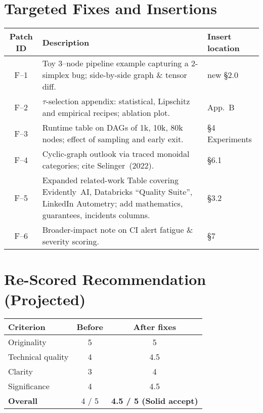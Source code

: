 \documentclass{article}
\begin{document}
\section{Targeted Fixes and Insertions}
\begin{tabular}{@{}c L{7.2cm} L{2.8cm}@{}}
\toprule
\textbf{Patch ID} & \textbf{Description} & \textbf{Insert location} \\
\midrule
F--1 & Toy 3--node pipeline example capturing a 2\hyp simplex bug; side\hyp by\hyp side graph \& tensor diff. & new \S2.0 \\
F--2 & \(\tau\)-selection appendix: statistical, Lipschitz and empirical recipes; ablation plot. & App.~B \\
F--3 & Runtime table on DAGs of 1k, 10k, 80k nodes; effect of sampling and early exit. & \S4 Experiments \\
F--4 & Cyclic\hyp graph outlook via traced monoidal categories; cite Selinger~(2022). & \S6.1 \\
F--5 & Expanded related\hyp work Table covering Evidently AI, Databricks ``Quality Suite'', LinkedIn Autometry; add mathematics, guarantees, incidents columns. & \S3.2 \\
F--6 & Broader\hyp impact note on CI alert fatigue \& severity scoring. & \S7 \\
\bottomrule
\end{tabular}

\section{Re\hyp Scored Recommendation (Projected)}
\begin{tabular}{@{}lcc@{}}
\toprule
\textbf{Criterion} & \textbf{Before} & \textbf{After fixes} \\
\midrule
Originality & 5 & 5 \\
Technical quality & 4 & 4.5 \\
Clarity & 3 & 4 \\
Significance & 4 & 4.5 \\
\midrule
\textbf{Overall} & 4 / 5 & \textbf{4.5 / 5 (Solid accept)} \\
\bottomrule
\end{tabular}
\end{document}
